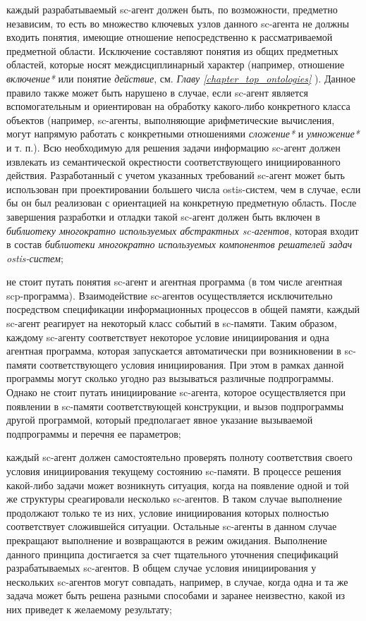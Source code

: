\begin{textitemize}
\item каждый разрабатываемый sc-агент должен быть, по возможности, предметно независим, то есть во множество ключевых узлов данного sc-агента не должны входить понятия, имеющие отношение непосредственно к рассматриваемой предметной области. Исключение составляют понятия из общих предметных областей, которые носят междисциплинарный характер (например, отношение \textit{включение*} или понятие \textit{действие}, см. \textit{Главу \ref{chapter_top_ontologies} }). Данное правило также может быть нарушено в случае, если sc-агент является вспомогательным и ориентирован на обработку какого-либо конкретного класса объектов (например, sc-агенты, выполняющие арифметические вычисления, могут напрямую работать с конкретными отношениями \textit{сложение*} и \textit{умножение*} и т. п.). Всю необходимую для решения задачи информацию sc-агент должен извлекать из семантической окрестности соответствующего инициированного действия. Разработанный с учетом указанных требований sc-агент может быть использован при проектировании большего числа ostis-систем, чем в случае, если бы он был реализован с ориентацией на конкретную предметную область. После завершения разработки и отладки такой sc-агент должен быть включен в \textit{библиотеку многократно используемых абстрактных sc-агентов}, которая входит в состав \textit{библиотеки многократно используемых компонентов решателей задач ostis-систем};
\item не стоит путать понятия sc-агент и агентная программа (в том числе агентная scp-программа). Взаимодействие sc-агентов осуществляется исключительно посредством спецификации информационных процессов в общей памяти, каждый sc-агент реагирует на некоторый класс событий в sc-памяти. Таким образом, каждому sc-агенту соответствует некоторое условие инициирования и одна агентная программа, которая запускается автоматически при возникновении в sc-памяти соответствующего условия инициирования. При этом в рамках данной программы могут сколько угодно раз вызываться различные подпрограммы. Однако не стоит путать инициирование sc-агента, которое осуществляется при появлении в sc-памяти соответствующей конструкции, и вызов подпрограммы другой программой, который предполагает явное указание вызываемой подпрограммы и перечня ее параметров;
\item каждый sc-агент должен самостоятельно проверять полноту соответствия своего условия инициирования текущему состоянию sc-памяти. В процессе решения какой-либо задачи может возникнуть ситуация, когда на появление одной и той же структуры среагировали несколько sc-агентов. В таком случае выполнение продолжают только те из них, условие инициирования которых полностью соответствует сложившейся ситуации. Остальные sc-агенты в данном случае прекращают выполнение и возвращаются в режим ожидания. Выполнение данного принципа достигается за счет тщательного уточнения спецификаций разрабатываемых sc-агентов. В общем случае условия инициирования у нескольких sc-агентов могут совпадать, например, в случае, когда одна и та же задача может быть решена разными способами и заранее неизвестно, какой из них приведет к желаемому результату;

\end{textitemize}
